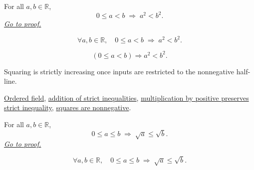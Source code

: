 \begin{theorem}
\label{thm:ineq-square-monotone}
For all $a, b \in \mathbb{R}$,
\[
  0 \le a < b \;\Rightarrow\; a^2 < b^2.
\]
\hyperref[prf:ineq-square-monotone]{\textit{Go to proof.}}
\end{theorem}



\begin{remark*}
\[
  \forall a, b \in \mathbb{R},\quad
  0 \le a < b \;\Rightarrow\; a^2 < b^2.
\]
\end{remark*}

\begin{remark*}
\[
(0\le a<b)\Rightarrow a^2<b^2.
\]
\end{remark*}

\begin{remark*}[Interpretation]
Squaring is strictly increasing once inputs are restricted to the nonnegative half-line.
\end{remark*}

\begin{dependencies}
\hyperref[def:real-ordered-field]{Ordered field},
\hyperref[thm:ineq-add-inequalities]{addition of strict inequalities},
\hyperref[thm:ineq-multiply-positive]{multiplication by positive preserves strict inequality},
\hyperref[prop:product-of-positives-is-positive-q]{squares are nonnegative}.
\end{dependencies}


\begin{theorem}
\label{thm:ineq-square-root-monotone}
For all $a, b \in \mathbb{R}$,
\[
  0 \le a \le b \;\Rightarrow\; \sqrt{a} \le \sqrt{b}.
\]
\hyperref[prf:ineq-square-root-monotone]{\textit{Go to proof.}}
\end{theorem}



\begin{remark*}
\[
  \forall a, b \in \mathbb{R},\quad
  0 \le a \le b \;\Rightarrow\; \sqrt{a} \le \sqrt{b}.
\]
\end{remark*}

